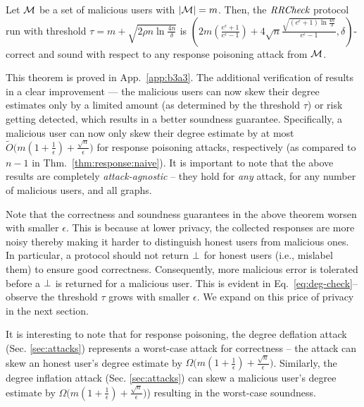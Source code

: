 \begin{thm}\label{thm:response:check}
Let $\mathcal{M}$ be a set of malicious users with $|\mathcal{M}| = m$. Then,
the  $\textit{RRCheck}$ protocol run with threshold $\tau = m + \sqrt{2\rho n \ln \tfrac{4n}{\delta}}$ is
  $\left( 2m (\frac{e^\epsilon+1}{e^{\epsilon}-1}) + 4\sqrt{n}\frac{ \sqrt{(e^\epsilon+1)\ln \frac{4n}{\delta}}}{e^\epsilon-1}, \delta\right)$-correct and sound with respect to any
response poisoning attack from $\mathcal{M}$.
\end{thm}
This theorem is proved in App.~\ref{app:b3a3}. The additional verification of \DegRRCheck{} results in a clear improvement --- the malicious users can now skew their degree estimates only by a limited amount (as determined by the threshold $\tau$)  or risk getting detected,  which results in a better soundness guarantee. Specifically, a malicious user can now only skew their degree estimate by at most $ \tilde{O}\big(m(1+\frac{1}{\epsilon}) + \frac{\sqrt{n}}{{\epsilon}}\big)$ for response poisoning attacks, respectively (as compared to $n-1$ in Thm.~\ref{thm:response:naive}). 
It is important to note that the above results are completely \textit{attack-agnostic} -- they hold for \textit{any} attack, for any number of malicious users, and all graphs.

Note that the correctness and soundness guarantees in the above theorem worsen with smaller $\epsilon$. This is because at lower privacy, the collected responses are more noisy thereby making it harder to distinguish honest users from malicious ones. In particular, a protocol should not return $\perp$ for honest users (i.e., mislabel them) to ensure good correctness. Consequently, more malicious error is tolerated before a $\perp$ is returned for a malicious user. This is evident in Eq.~\ref{eq:deg-check}--observe the threshold $\tau$ grows with smaller $\epsilon$. We expand on this price of privacy in the next section. 

It is interesting to note that for response poisoning, the degree deflation attack (Sec. \ref{sec:attacks}) represents a worst-case attack for correctness -- the attack can skew an honest user's degree estimate by $\Omega\big(m(1+\frac{1}{\epsilon})+\frac{\sqrt{n}}{\epsilon}\big)$.  Similarly, the degree inflation attack (Sec. \ref{sec:attacks}) can skew a malicious user's degree estimate by $\Omega\big(m(1+\frac{1}{\epsilon})+\frac{\sqrt{n}}{\epsilon}\big)$) resulting in the worst-case soundness. %

